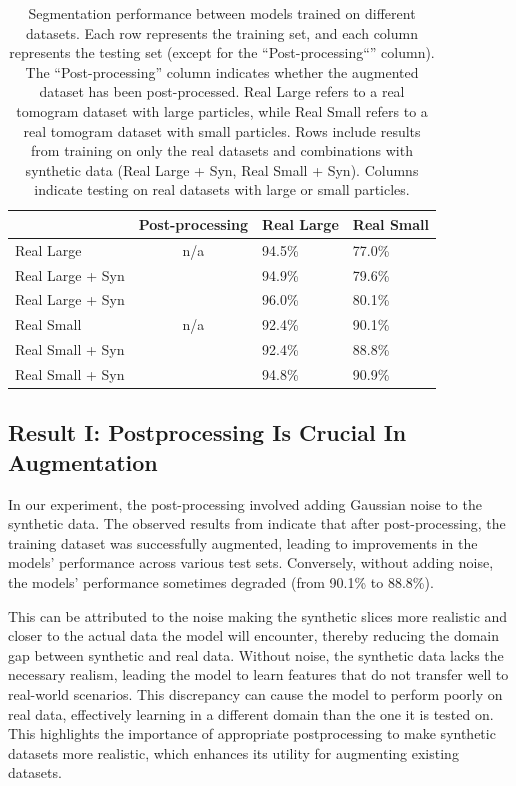 \documentclass[preprint,12pt]{elsarticle}
\newcommand{\cmark}{\ding{51}}%
\newcommand{\xmark}{\ding{55}}%
\begin{document}
\begin{table}[]
    \center
    \begin{tabular}{|l|c|l|l|}
        \hline
                               & Post-processing & Real Large & Real Small \\ \hline
        Real Large             & n/a    & 94.5\%     & 77.0\%     \\ \hline
        Real Large + Syn       & \xmark & 94.9\%     & 79.6\%     \\ \hline
        Real Large + Syn       & \cmark & 96.0\%     & 80.1\%     \\ \hline \hline
        Real Small             & n/a    & 92.4\%     & 90.1\%     \\ \hline
        Real Small + Syn       & \xmark & 92.4\%     & 88.8\%     \\ \hline
        Real Small + Syn       & \cmark & 94.8\%     & 90.9\%     \\ \hline
    \end{tabular}
    \caption{Segmentation performance between models trained on different datasets. 
    Each row represents the training set, and each column represents the testing set (except for the ``Post-processing``'' column). 
    The ``Post-processing'' column indicates whether the augmented dataset has been post-processed.
    Real Large refers to a real tomogram dataset with large particles, while Real Small refers to a real tomogram dataset with small particles. 
    Rows include results from training on only the real datasets and combinations with synthetic data (Real Large + Syn, Real Small + Syn). 
    Columns indicate testing on real datasets with large or small particles.
    }
    \label{tab:res1}
\end{table}

\subsection{Result I: Postprocessing Is Crucial In Augmentation}
In our experiment, the post-processing involved adding Gaussian noise to the synthetic data. 
The observed results from  indicate that after post-processing, the training dataset was successfully augmented, leading to improvements in the models' performance across various test sets. 
Conversely, without adding noise, the models' performance sometimes degraded (from 90.1\% to 88.8\%).

This can be attributed to the noise making the synthetic slices more realistic and closer to the actual data the model will encounter, thereby reducing the domain gap between synthetic and real data.
Without noise, the synthetic data lacks the necessary realism, leading the model to learn features that do not transfer well to real-world scenarios.
This discrepancy can cause the model to perform poorly on real data, effectively learning in a different domain than the one it is tested on. This highlights the importance of appropriate postprocessing to make synthetic datasets more realistic, which enhances its utility for augmenting existing datasets.
\end{document}
